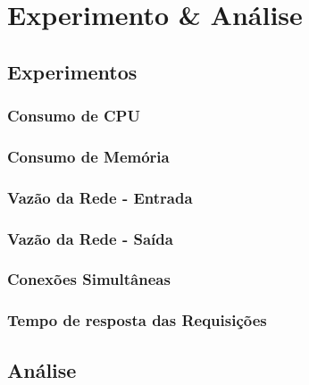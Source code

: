 \chapter{Experimento \& Análise}
\label{cap7}
\section{Experimentos}

\subsection{Consumo de CPU}
\subsection{Consumo de Memória}

\subsection{Vazão da Rede - Entrada}

\subsection{Vazão da Rede - Saída}

\subsection{Conexões Simultâneas}

\subsection{Tempo de resposta das Requisições}

\section{Análise}

